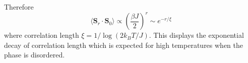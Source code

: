 \documentclass[aps,prb,onecolumn,notitlepage,showpacs,floatfix,superscriptaddress]{revtex4-1}
\begin{document}
Therefore
\begin{equation}
\langle {\bm S}_r \cdot  {\bm S}_0 \rangle \propto \left(\dfrac{\beta J}{2}\right)^{r} \sim e^{-r/\xi}
\end{equation}
where correlation length $\xi=1/\log(2k_B T/J)$. This displays the exponential decay of correlation length which is expected for high temperatures when the phase is disordered.
\end{document}
